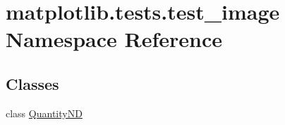 \hypertarget{namespacematplotlib_1_1tests_1_1test__image}{}\section{matplotlib.\+tests.\+test\+\_\+image Namespace Reference}
\label{namespacematplotlib_1_1tests_1_1test__image}
\subsection*{Classes}
\begin{DoxyCompactItemize}
\item 
class \hyperlink{classmatplotlib_1_1tests_1_1test__image_1_1QuantityND}{Quantity\+ND}
\end{DoxyCompactItemize}
